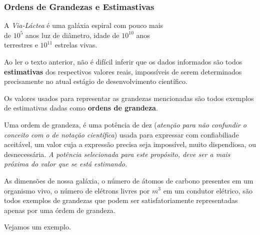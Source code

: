 \documentclass[a4paper, 11pt]{report}
\begin{document}
\subsubsection{Ordens de Grandezas e Estimastivas}

\begin{flushright}
    A \emph{Via-Láctea} é uma galáxia espiral com pouco mais \\
    de $10^5$ anos luz de diâmetro, idade de $10^{10}$ anos \\
    terrestres e $10^{11}$ estrelas vivas. 
\end{flushright}

Ao ler o texto anterior, não é difícil inferir que os dados informados são todos
\textbf{estimativas} dos respectivos valores reais, impossíveis de serem 
determinados precisamente no atual estágio de desenvolvimento científico. 

Os valores usados para representar as grandezas mencionadas são todos exemplos de 
estimativas dadas como \textbf{ordens de grandeza}. 

Uma ordem de grandeza, é uma potência de dez (\emph{atenção para não confundir
o conceito com o de notação científica}) usada para expressar com confiabiliade 
aceitável, um valor cuja a expressão precisa seja impossível, muito dispendiosa, 
ou desnecessária. \emph{A potência selecionada para este propósito, deve ser a mais
próxima do valor que se está estimando.} 

As dimensões de nossa galáxia, o número de átomos de carbono presentes em um 
organismo vivo, o número de elétrons livres por $m^3$ em um condutor elétrico, 
são todos exemplos de grandezas que podem ser satisfatoriamente representadas 
apenas por uma órdem de grandeza. 

Vejamos um exemplo.
\end{document}
